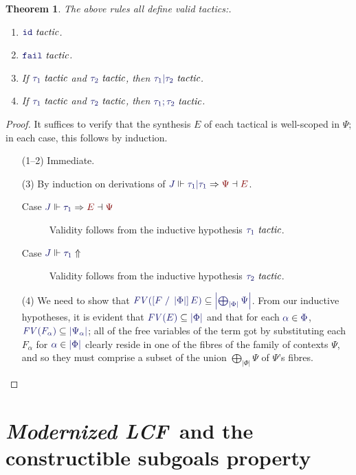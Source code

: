 \documentclass[11pt]{article}
\newtheorem{thm}{Theorem}[section]
\theoremstyle{definition}
\theoremstyle{remark}
\numberwithin{equation}{section}
\def\InputModeColorName{MidnightBlue}
\def\OutputModeColorName{Maroon}
\newcommand\InputMode[1]{{\color{\InputModeColorName}{#1}}}
\newcommand\OutputMode[1]{{\color{\OutputModeColorName}{#1}}}
\newcommand\JJ{J}
\newcommand\IsTac[1]{\InputMode{#1}\ \textit{tactic}}
\newcommand\Refine[4]{\InputMode{#1}\Vdash\InputMode{#2}\Rightarrow\OutputMode{#4}\dashv\OutputMode{#3}}
\newcommand\NoRefine[2]{\InputMode{#1}\Vdash\InputMode{#2}\Uparrow}
\newcommand\Member[2]{\InputMode{#1}\in\InputMode{#2}}
\newcommand\IdTac{\mathtt{id}}
\newcommand\FailTac{\mathtt{fail}}
\newcommand\OrElseTac[2]{#1\vert#2}
\newcommand\ThenTac[2]{#1;#2}
\newcommand\Dom[1]{\left\vert#1\right\vert}
\newcommand\SubsetEq[2]{\InputMode{#1}\subseteq\InputMode{#2}}
\newcommand\FV[1]{\textit{FV}\left(#1\right)}
\newcommand\Subst[3]{\left[#1\;/\;#2\right]#3}
\newcommand\ModLCF{\textbf{\emph{Modernized LCF}}}
\begin{document}
\begin{thm}
  The above rules all define valid tactics:.
  \begin{enumerate}
    \item $\IsTac{\IdTac}$.
    \item $\IsTac{\FailTac}$.
    \item If $\IsTac{\tau_1}$ and $\IsTac{\tau_2}$, then
      $\IsTac{\OrElseTac{\tau_1}{\tau_2}}$.
    \item If $\IsTac{\tau_1}$ and $\IsTac{\tau_2}$, then
      $\IsTac{\ThenTac{\tau_1}{\tau_2}}$.
  \end{enumerate}
\end{thm}
\begin{proof}
  It suffices to verify that the synthesis $E$ of each tactical is well-scoped
  in $\Psi$; in each case, this follows by induction.
  \begin{enumerate}
    \item[(1--2)] Immediate.
    \item[(3)]
      By induction on derivations of
      $\Refine{\JJ}{\OrElseTac{\tau_1}{\tau_1}}{E}{\Psi}$.
      \begin{description}
        \item[Case $\Refine{\JJ}{\tau_1}{\Psi}{E}$] Validity follows from the
          inductive hypothesis $\IsTac{\tau_1}$.
        \item[Case $\NoRefine{\JJ}{\tau_1}$] Validity follows from the
          inductive hypothesis $\IsTac{\tau_2}$.
      \end{description}

    \item[(4)] We need to show that
      $\SubsetEq{\FV{\Subst{F}{\Dom\Phi}{E}}}{\Dom{\bigoplus_{\Dom\Phi}\Psi}}$.
      From our inductive hypotheses, it is evident that
      $\SubsetEq{\FV{E}}{\Dom\Phi}$ and that for each $\Member{\alpha}{\Phi}$,
      $\SubsetEq{\FV{F_\alpha}}{\Dom{\Psi_\alpha}}$; all of the free variables
      of the term got by substituting each $F_\alpha$ for
      $\Member{\alpha}{\Dom\Phi}$ clearly reside in one of the fibres of the
      family of contexts $\Psi$, and so they must comprise a subset of the
      union $\bigoplus_{\Dom\Phi}\Psi$ of $\Psi$'s fibres.

  \end{enumerate}
\end{proof}

\section{\ModLCF\ and the constructible subgoals property}
\end{document}
